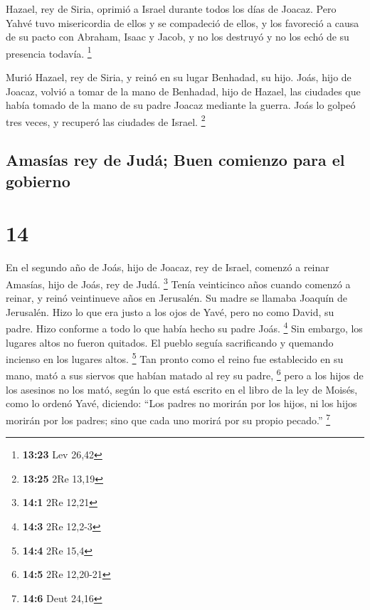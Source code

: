  Hazael, rey de Siria, oprimió a Israel durante todos los
días de Joacaz.  Pero Yahvé tuvo misericordia de ellos y
se compadeció de ellos, y los favoreció a causa de su pacto con Abraham,
Isaac y Jacob, y no los destruyó y no los echó de su presencia todavía.
\footnote{\textbf{13:23} Lev 26,42}

 Murió Hazael, rey de Siria, y reinó en su lugar
Benhadad, su hijo.  Joás, hijo de Joacaz, volvió a tomar
de la mano de Benhadad, hijo de Hazael, las ciudades que había tomado de
la mano de su padre Joacaz mediante la guerra. Joás lo golpeó tres
veces, y recuperó las ciudades de Israel. \footnote{\textbf{13:25} 2Re
  13,19}

\hypertarget{amasuxedas-rey-de-juduxe1-buen-comienzo-para-el-gobierno}{%
\subsection{Amasías rey de Judá; Buen comienzo para el
gobierno}\label{amasuxedas-rey-de-juduxe1-buen-comienzo-para-el-gobierno}}

\hypertarget{section-13}{%
\section{14}\label{section-13}}

 En el segundo año de Joás, hijo de Joacaz, rey de Israel,
comenzó a reinar Amasías, hijo de Joás, rey de Judá. \footnote{\textbf{14:1}
  2Re 12,21}  Tenía veinticinco años cuando comenzó a
reinar, y reinó veintinueve años en Jerusalén. Su madre se llamaba
Joaquín de Jerusalén.  Hizo lo que era justo a los ojos de
Yavé, pero no como David, su padre. Hizo conforme a todo lo que había
hecho su padre Joás. \footnote{\textbf{14:3} 2Re 12,2-3} 
Sin embargo, los lugares altos no fueron quitados. El pueblo seguía
sacrificando y quemando incienso en los lugares altos. \footnote{\textbf{14:4}
  2Re 15,4}  Tan pronto como el reino fue establecido en
su mano, mató a sus siervos que habían matado al rey su padre,
\footnote{\textbf{14:5} 2Re 12,20-21}  pero a los hijos de
los asesinos no los mató, según lo que está escrito en el libro de la
ley de Moisés, como lo ordenó Yavé, diciendo: ``Los padres no morirán
por los hijos, ni los hijos morirán por los padres; sino que cada uno
morirá por su propio pecado.'' \footnote{\textbf{14:6} Deut 24,16}

